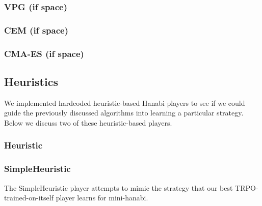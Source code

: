 \subsubsection{VPG (if space)}
\subsubsection{CEM (if space)}
\subsubsection{CMA-ES (if space)}

\subsection{Heuristics}

We implemented hardcoded heuristic-based Hanabi players to see if we could
guide the previously discussed algorithms into learning a particular strategy.
Below we discuss two of these heuristic-based players.

\subsubsection{Heuristic}
\subsubsection{SimpleHeuristic}

The SimpleHeuristic player attempts to mimic the strategy that our best
TRPO-trained-on-itself player learns for mini-hanabi.

